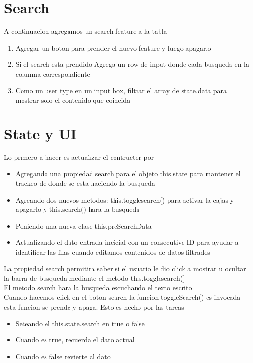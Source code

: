 \section{Search}
A continuacion agregamos un search feature a la tabla 
\begin{enumerate}
  \item Agregar un boton para prender el nuevo feature y luego apagarlo
  \item Si el search esta prendido Agrega un row de input donde cada busqueda en la columna correspondiente
  \item Como un user type en un input box, filtrar el array de state.data para mostrar solo el contenido que coincida
\end{enumerate}
\section{State y UI}
Lo primero a hacer es actualizar el contructor por
\begin{itemize}
  \item Agregando una propiedad search para el objeto this.state para mantener el trackeo de donde se esta haciendo la busqueda
  \item Agreando dos nuevos metodos: this.togglesearch() para activar la cajas y apagarlo y this.search() hara la busqueda
  \item Poniendo una nueva clase  this.preSearchData
  \item Actualizando el dato entrada incicial con un consecutive ID para ayudar a identificar las filas cuando editamos contenidos de datos filtrados
\end{itemize}
La propiedad search permitira saber si el usuario le dio click a mostrar u ocultar la barra de busqueda mediante el metodo this.togglesearch()\\
El metodo search hara la busqueda escuchando el texto escrito \\
Cuando hacemos click en el boton search la funcion toggleSearch() es invocada esta funcion se prende y apaga. Esto es hecho por las tareas
\begin{itemize}
  \item Seteando el this.state.search en true o false
  \item Cuando es true, recuerda el dato actual
  \item Cuando es false revierte al dato 
\end{itemize}
